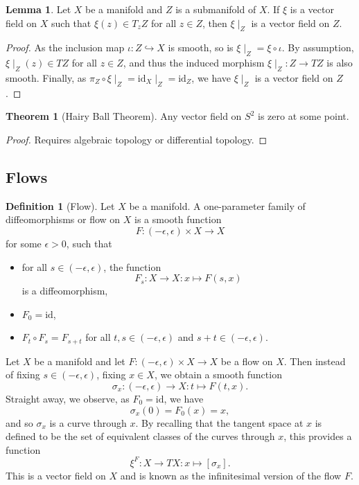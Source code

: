 \documentclass[]{article}
\theoremstyle{definition}
\newtheorem{theorem}{Theorem}
\theoremstyle{definition}
\newtheorem{definition}{Definition}[section]
\newtheorem{lemma}{Lemma}[section]
\begin{document}
\begin{lemma}
  Let \(X\) be a manifold and \(Z\) is a submanifold of \(X\). If \(\xi\) is a 
  vector field on \(X\) such that \(\xi(z) \in T_z Z\) for all \(z \in Z\), then 
  \(\xi\mid_Z\) is a vector field on \(Z\).
\end{lemma}
\begin{proof}
  As the inclusion map \(\iota : Z \hookrightarrow X\) is smooth, so is 
  \(\xi\mid_Z = \xi \circ \iota\). By assumption, \(\xi\mid_Z(z) \in TZ\) for 
  all \(z \in Z\), and thus the induced morphism \(\xi\mid_Z : Z \to TZ\) 
  is also smooth. Finally, as \(\pi_Z \circ \xi\mid_Z = \text{id}_X\mid_Z 
  = \text{id}_Z\), we have \(\xi\mid_Z\) is a vector field on \(Z\).
\end{proof}

\begin{theorem}[Hairy Ball Theorem]
  Any vector field on \(S^2\) is zero at some point.
\end{theorem}
\begin{proof}
  Requires algebraic topology or differential topology.
\end{proof}

\subsection{Flows}

\begin{definition}[Flow]
  Let \(X\) be a manifold. A one-parameter family of diffeomorphisms or 
  flow on \(X\) is a smooth function 
  \[F : (-\epsilon, \epsilon) \times X \to X\]
  for some \(\epsilon > 0\), such that 
  \begin{itemize}
    \item for all \(s \in (-\epsilon, \epsilon)\), the function 
      \[F_s : X \to X : x \mapsto F(s, x)\]
      is a diffeomorphism,
    \item \(F_0 = \text{id}\),
    \item \(F_t \circ F_s = F_{s + t}\) for all \(t, s \in (-\epsilon, \epsilon)\) 
      and \(s + t \in (-\epsilon, \epsilon)\).
  \end{itemize}
\end{definition}

Let \(X\) be a manifold and let \(F : (-\epsilon, \epsilon) \times X \to X\) 
be a flow on \(X\). Then instead of fixing \(s \in (-\epsilon, \epsilon)\), 
fixing \(x \in X\), we obtain a smooth function 
\[\sigma_x : (-\epsilon, \epsilon) \to X : t \mapsto F(t, x).\]
Straight away, we observe, as \(F_0 = \text{id}\), we have 
\[\sigma_x(0) = F_0(x) = x,\]
and so \(\sigma_x\) is a curve through \(x\). By recalling that the tangent 
space at \(x\) is defined to be the set of equivalent classes of the curves 
through \(x\), this provides a function 
\[\xi^F : X \to TX : x \mapsto [\sigma_x].\]
This is a vector field on \(X\) and is known as the infinitesimal version of 
the flow \(F\).
\end{document}
